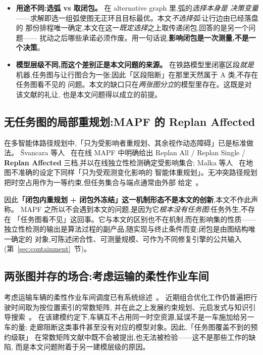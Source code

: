 \documentclass[manuscript,screen,review]{acmart}
\begin{document}
\begin{itemize}[leftmargin=1.5em,itemsep=0.25em]
\item \textbf{用途不同:选弧 vs 取闭包。} 在 alternative graph 里,弧的\emph{选择本身是
决策变量}——求解即选一组弧使图无正环且目标最优。本文\emph{不选择弧}:让行边由已经落盘的
那份排程唯一确定,本文在这一\emph{既定选择}之上取传递闭包,回答的是另一个问题——
扰动之后哪些承诺必须作废。用一句话说,\textbf{影响闭包是一次测量,不是一个决策}。
\item \textbf{模型层级不同,而这个差别正是本文问题的来源。} 在铁路模型里闭塞区段\emph{就是}
机器,任务图与让行图合为一张;因此「区段阻断」在那里天然属于 A 类,不存在任务图看不见的
问题。本文的缺口只在\emph{两张图分立}的模型里存在。这既是对该文献的礼让,
也是本文问题得以成立的前提。
\end{itemize}

\subsection{无任务图的局部重规划:MAPF 的 Replan Affected}
\label{sec:rw_mapf}

在多智能体路径规划中,「只为受影响者重规划、其余视作动态障碍」已是标准做法。
Švancara 等人~\cite{svancara2019online} 在在线 MAPF 中明确给出 Replan All /
Replan Single / \textbf{Replan Affected} 三档,并以在线独立性检测确定受影响集合;
Malka 等人~\cite{malka2024online} 在地图不准确的设定下同样「只为受观测变化影响的
智能体重规划」。无冲突路径规划把时空占用作为一等约束,但任务集合与端点通常由外部
给定~\cite{zhang2024guidance}。

因此\textbf{「闭包内重规划 + 闭包外冻结」这一机制形态不是本文的创新},本文不作此声称。
MAPF 之所以不会遇到本文的问题,是因为它\emph{根本没有任务图}:任务外生,不存在
「任务图看不见」这回事。它与本文的区别也不在机制,而在影响集的性质——
独立性检测的输出是算法过程的副产品,随实现与终止条件而变;闭包是由图结构唯一确定的
对象,可陈述闭合性、可测量规模、可作为不同修复引擎的公共输入
(第~\ref{sec:containment}~节)。

\subsection{两张图并存的场合:考虑运输的柔性作业车间}
\label{sec:rw_position}

考虑运输车辆的柔性作业车间调度已有系统综述~\cite{xin2025review}。
近期组合优化工作仍普遍把行驶时间取为按位置索引的常数矩阵,
并在此之上发展约束规划、元启发式与知识引导搜索~\cite{meng2025cp,qin2026knowledge,fu2025integrated}。
在该建模约定下,车辆互不占用同一时空资源,延误不是一车施加给另一车的量;
走廊阻断这类事件甚至没有对应的模型对象。因此,「任务图覆盖不到的预约级联」
在常数矩阵文献中既不会被提出,也无法被检验——这不是那些工作的缺陷,
而是本文问题附着于另一建模层级的原因。
\end{document}
